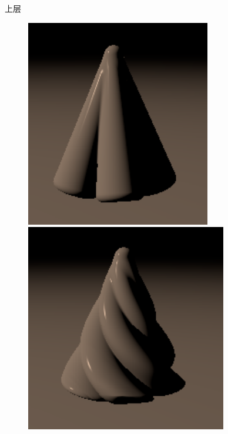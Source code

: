 \documentclass[aspectratio=169]{ctexbeamer} %
\begin{document}
\begin{frame}
\begin{block}{上层}
\begin{figure}[htbp]
            \includegraphics[height=.2\textheight]{images/pre/head/cream2-1.pdf}
            \includegraphics[height=.2\textheight]{images/pre/head/cream2-2.pdf}
            \caption{}
            \label{fig:upper_cream}
        \end{figure}
    \end{block}
\end{frame}
\end{document}
